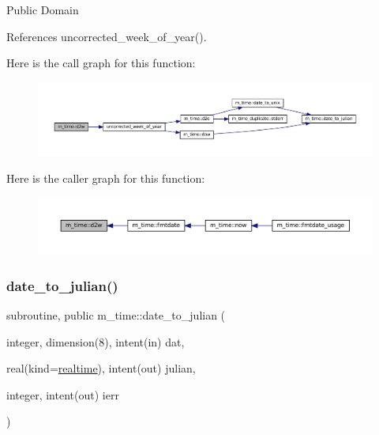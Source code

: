 Public Domain 

References uncorrected\+\_\+week\+\_\+of\+\_\+year().

Here is the call graph for this function\+:\nopagebreak
\begin{figure}[H]
\begin{center}
\leavevmode
\includegraphics[width=350pt]{namespacem__time_ad4ff99ad6f6d5282c4b65ad636a2a627_cgraph}
\end{center}
\end{figure}
Here is the caller graph for this function\+:\nopagebreak
\begin{figure}[H]
\begin{center}
\leavevmode
\includegraphics[width=350pt]{namespacem__time_ad4ff99ad6f6d5282c4b65ad636a2a627_icgraph}
\end{center}
\end{figure}
\mbox{\label{namespacem__time_acfdc970b4154b0c15bd33727636e3992}} 
\subsubsection{\texorpdfstring{date\+\_\+to\+\_\+julian()}{date\_to\_julian()}}
{\footnotesize\ttfamily subroutine, public m\+\_\+time\+::date\+\_\+to\+\_\+julian (\begin{DoxyParamCaption}\item[{integer, dimension(8), intent(in)}]{dat,  }\item[{real(kind=\mbox{\hyperlink{namespacem__time_ac10ea9e8d59ec74eaa7d89f2517d7422}{realtime}}), intent(out)}]{julian,  }\item[{integer, intent(out)}]{ierr }\end{DoxyParamCaption})}



